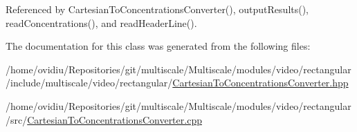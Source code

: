 \-Referenced by \-Cartesian\-To\-Concentrations\-Converter(), output\-Results(), read\-Concentrations(), and read\-Header\-Line().



\-The documentation for this class was generated from the following files\-:\begin{DoxyCompactItemize}
\item 
/home/ovidiu/\-Repositories/git/multiscale/\-Multiscale/modules/video/rectangular/include/multiscale/video/rectangular/\hyperlink{CartesianToConcentrationsConverter_8hpp}{\-Cartesian\-To\-Concentrations\-Converter.\-hpp}\item 
/home/ovidiu/\-Repositories/git/multiscale/\-Multiscale/modules/video/rectangular/src/\hyperlink{CartesianToConcentrationsConverter_8cpp}{\-Cartesian\-To\-Concentrations\-Converter.\-cpp}\end{DoxyCompactItemize}
